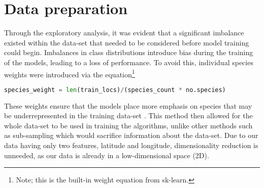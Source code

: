 \section{Data preparation}



Through the exploratory analysis, it was evident that a significant imbalance existed within the data-set that needed to be considered before model training could begin. Imbalances in class distributions introduce bias during the training of the models, leading to a loss of performance. To avoid this, individual species weights were introduced via the equation\footnote{Note; this is the built-in weight equation from sk-learn.} 
\begin{lstlisting}[language=Python] 
species_weight = len(train_locs)/(species_count * no.species) 
\end{lstlisting}
These weights ensure that the models place more emphasis on species that may be underrepresented in the training data-set \cite{hashemi2018weighted}. This method then allowed for the whole data-set to be used in training the algorithms, unlike other methods such as sub-sampling which would sacrifice information about the data-set. Due to our data having only two features, latitude and longitude, dimensionality reduction is unneeded, as our data is already in a low-dimensional space (2D).


